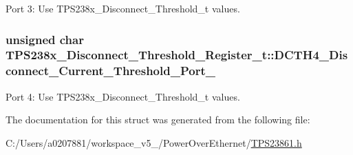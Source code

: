 Port 3\-: Use T\-P\-S238x\-\_\-\-Disconnect\-\_\-\-Threshold\-\_\-t values. 

\hypertarget{struct_t_p_s238x___disconnect___threshold___register__t_a5653ac33e0a356e9bd1652fd91f9d2a0}{
\subsubsection[{D\-C\-T\-H4\-\_\-\-Disconnect\-\_\-\-Current\-\_\-\-Threshold\-\_\-\-Port\-\_\-4}]{\setlength{\rightskip}{0pt plus 5cm}unsigned char T\-P\-S238x\-\_\-\-Disconnect\-\_\-\-Threshold\-\_\-\-Register\-\_\-t\-::\-D\-C\-T\-H4\-\_\-\-Disconnect\-\_\-\-Current\-\_\-\-Threshold\-\_\-\-Port\-\_}}\label{struct_t_p_s238x___disconnect___threshold___register__t_a5653ac33e0a356e9bd1652fd91f9d2a0}


Port 4\-: Use T\-P\-S238x\-\_\-\-Disconnect\-\_\-\-Threshold\-\_\-t values. 



The documentation for this struct was generated from the following file\-:\begin{DoxyCompactItemize}
\item 
C\-:/\-Users/a0207881/workspace\-\_\-v5\-\_/\-Power\-Over\-Ethernet/\hyperlink{_t_p_s23861_8h}{T\-P\-S23861.\-h}\end{DoxyCompactItemize}
